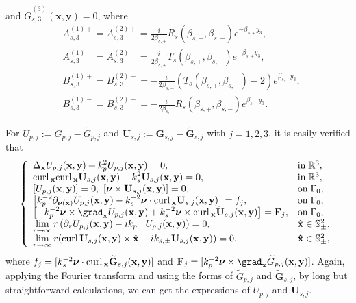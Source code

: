 \documentclass[final,reqno]{siamltex}
\newcommand{\pa}{\partial}
\newcommand{\curl}{{\rm curl\,}}
\newcommand{\wid}{\widetilde}
\newcommand{\mat}{\mathbb}
\newcommand{\R}{{\mat R}}
\newcommand{\Sp}{{\mat S}}
\newcommand{\ben}{\begin{eqnarray*}}
\newcommand{\enn}{\end{eqnarray*}}
\begin{document}
and $\wid G_{s,3}^{(3)}(\mathbf{x},\mathbf{y})=0$, where 
\begin{align*}
&A_{s,3}^{(1)+}=A_{s,3}^{(2)+}=\frac{i}{2\beta_{s,+}}R_s(\beta_{s,+},\beta_{s,-})e^{-\beta_{s,+}y_3}, \\ &A_{s,3}^{(1)-}=A_{s,3}^{(2)-}=\frac{i}{2\beta_{s,+}}T_s(\beta_{s,+},\beta_{s,-})e^{-\beta_{s,+}y_3}, \\
&B_{s,3}^{(1)+}=B_{s,3}^{(2)+}=-\frac{i}{2\beta_{s,-}}(T_s(\beta_{s,+},\beta_{s,-})-2)e^{\beta_{s,-}y_3}, \\
&B_{s,3}^{(1)-}=B_{s,3}^{(2)-}=-\frac{i}{2\beta_{s,-}}R_s(\beta_{s,+},\beta_{s,-})e^{\beta_{s,-}y_3}. 
\end{align*}

For $U_{p,j}:=G_{p,j}-\wid G_{p,j}$ and $\mathbf{U}_{s,j}:=\mathbf{G}_{s,j}-\mathbf{\wid G}_{s,j}$ with $j=1,2,3$, it is easily verified that 
\ben
\left\{
\begin{array}{ll}
	\displaystyle\Delta_\mathbf{x}U_{p,j}(\mathbf{x},\mathbf{y})+k_p^2U_{p,j}(\mathbf{x},\mathbf{y})=0,&{\rm in}\;\R^3,~ \\ 
	\displaystyle\curl_\mathbf{x}\curl_{\mathbf{x}}\mathbf{U}_{s,j}(\mathbf{x},\mathbf{y})-k_s^2\mathbf{U}_{s,j}(\mathbf{x},\mathbf{y})=0,&{\rm in}\;\R^3,~ \\
	\left[U_{p,j}(\mathbf{x},\mathbf{y})\right]=0,~\left[\boldsymbol{\nu}\times \mathbf{U}_{s,j}(\mathbf{x},\mathbf{y})\right]=0,&{\rm on}\;\Gamma_0,~ \\
	\displaystyle\left[k_p^{-2}\pa_{\boldsymbol{\nu}(\mathbf{x})}U_{p,j}(\mathbf{x},\mathbf{y})-k_s^{-2}\boldsymbol{\nu}\cdot\curl_{\mathbf{x}}\mathbf{U}_{s,j}(\mathbf{x},\mathbf{y})\right]=f_j,&{\rm on}\;\Gamma_0,~ \\
	\displaystyle\left[-k_p^{-2}\boldsymbol{\nu}\times\grad_{\mathbf{x}}U_{p,j}(\mathbf{x},\mathbf{y})+k_s^{-2}\boldsymbol{\nu}\times\curl_{\mathbf{x}}\mathbf{U}_{s,j}(\mathbf{x},\mathbf{y})\right]=\mathbf{F}_j,&{\rm on}\;\Gamma_0,~ \\
	\lim\limits_{r\rightarrow\infty}r\left(\pa_rU_{p,j}(\mathbf{x},\mathbf{y})-ik_{p,\pm}U_{p,j}(\mathbf{x},\mathbf{y})\right)=0,~~~&\mathbf{\hat x}\in\Sp^2_\pm, \\
	\lim\limits_{r\rightarrow\infty}r(\curl\mathbf{U}_{s,j}(\mathbf{x},\mathbf{y})\times\hat{\mathbf{x}}-ik_{s,\pm}\mathbf{U}_{s,j}(\mathbf{x},\mathbf{y}))=0,~~~&\mathbf{\hat x}\in\Sp^2_\pm, 
\end{array}
\right.
\enn
where $f_j=[k_{s}^{-2}\boldsymbol{\nu}\cdot\curl_{\mathbf{x}}\mathbf{\wid G}_{s,j}(\mathbf{x},\mathbf{y})]$ and $\mathbf{F}_j=[k_{p}^{-2}\boldsymbol{\nu}\times\grad_{\mathbf{x}}\wid G_{p,j}(\mathbf{x},\mathbf{y})]$. Again, applying the Fourier transform and using the forms of $\wid G_{p,j}$ and $\mathbf{\wid G}_{s,j}$, by long but straightforward calculations, we can get the expressions of $U_{p,j}$ and $\mathbf{U}_{s,j}$. 
\end{document}
